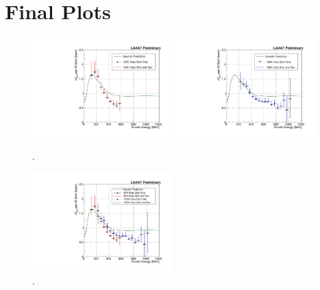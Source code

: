 \section{Final Plots}\label{ch:FinalPion}

\begin{figure}[htb]
\centering
\includegraphics[width=0.48\textwidth]{Chapter-6/Images/TheMoneyPlot60A.pdf}
\includegraphics[width=0.48\textwidth]{Chapter-6/Images/TheMoneyPlot100A.pdf}
\caption{.}
\label{fig:FinalXSPion}
\end{figure}

\begin{figure}[htb]
\centering
\includegraphics[width=0.48\textwidth]{Chapter-6/Images/TheMoneyPlot.pdf}
\caption{.}
\label{fig:FinalXSPion}
\end{figure}
